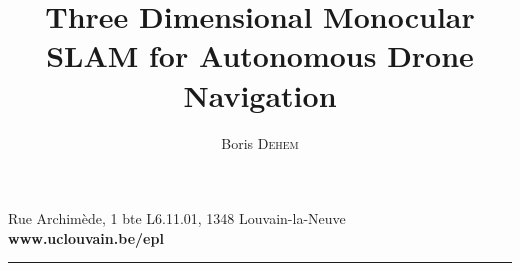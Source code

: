 \documentclass[11pt, a4paper, twoside, openright]{report}
\title{Three Dimensional Monocular SLAM for Autonomous Drone Navigation}
\author{Boris \textsc{Dehem}}
\begin{document}
\setlength{\parindent}{0cm}




\tableofcontents


\ifodd\value{page}\hbox{}\newpage\thispagestyle{empty}\hbox{}\newpage\fi









\printbibliography%

\appendix



\newpage
\thispagestyle{empty}
\vspace*{17.75cm}
\noindent \footnotesize \color{UCLblue}  \selectfont Rue Archim\`{e}de, 1 bte L6.11.01, 1348 Louvain-la-Neuve ~ ~ \color{EPLblue} \textbf{www.uclouvain.be/epl} \\
\vspace*{6pt}
\textcolor{EPLblue}{\rule{18.5cm}{8.25cm}}
\end{document}
